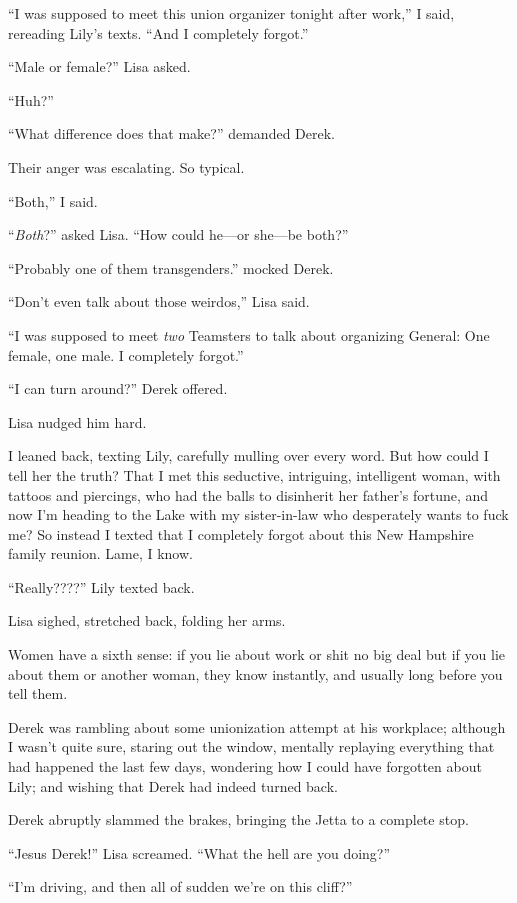 ``I was supposed to meet this union organizer tonight after work,'' I
said, rereading Lily's texts. ``And I completely forgot.''

``Male or female?'' Lisa asked.

``Huh?''

``What difference does that make?'' demanded Derek.

Their anger was escalating. So typical.

``Both,'' I said.

``\emph{Both}?'' asked Lisa. ``How could he---or she---be both?''

``Probably one of them transgenders.'' mocked Derek.

``Don't even talk about those weirdos,'' Lisa said.

``I was supposed to meet \emph{two} Teamsters to talk about organizing
General: One female, one male. I completely forgot.''

``I can turn around?'' Derek offered.

Lisa nudged him hard.

I leaned back, texting Lily, carefully mulling over every word. But how
could I tell her the truth? That I met this seductive, intriguing,
intelligent woman, with tattoos and piercings, who had the balls to
disinherit her father's fortune, and now I'm heading to the Lake with my
sister-in-law who desperately wants to fuck me? So instead I texted that
I completely forgot about this New Hampshire family reunion. Lame, I
know.

``Really????'' Lily texted back.

Lisa sighed, stretched back, folding her arms.

Women have a sixth sense: if you lie about work or shit no big deal but
if you lie about them or another woman, they know instantly, and usually
long before you tell them.

Derek was rambling about some unionization attempt at his workplace;
although I wasn't quite sure, staring out the window, mentally replaying
everything that had happened the last few days, wondering how I could
have forgotten about Lily; and wishing that Derek had indeed turned
back.

Derek abruptly slammed the brakes, bringing the Jetta to a complete
stop.

``Jesus Derek!'' Lisa screamed. ``What the hell are you doing?''

``I'm driving, and then all of sudden we're on this cliff?''

